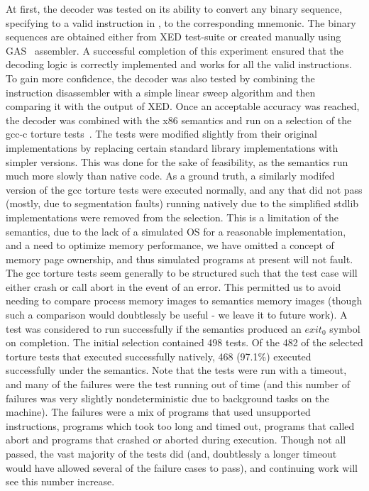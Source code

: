 At first, the decoder was tested on its ability to  convert any binary sequence, specifying to a valid instruction in \ISA, to the corresponding mnemonic. The binary sequences are  obtained either from XED test-suite or created manually using GAS~\cite{gas} assembler. A successful completion of this experiment ensured that the decoding logic is correctly implemented and works for all the valid \ISA instructions. To gain more confidence, the decoder was also tested by combining the instruction disassembler with a simple linear sweep algorithm and then comparing it with the output of XED.  Once an acceptable accuracy was reached, the decoder was combined with the x86 semantics and run on a selection of the gcc-c torture tests~\cite{CTORTURE}.  The tests were modified slightly from their original implementations by replacing certain standard library implementations with simpler versions.  This was done for the sake of feasibility, as the semantics run much more slowly than native code.  As a ground truth, a similarly modifed version of the gcc torture tests were executed normally, and any that did not pass (mostly, due to segmentation faults) running natively due to the simplified stdlib implementations were removed from the selection. This is a limitation of the semantics, due to the lack of a simulated OS for a reasonable implementation, and a need to optimize memory performance, we have omitted a concept of memory page ownership, and thus simulated programs at present will not fault. The gcc torture tests seem generally to be structured such that the test case will either crash or call abort in the event of an error.  This permitted us to avoid needing to compare process memory images to semantics memory images (though such a comparison would doubtlessly be useful - we leave it to future work).  A test was considered to run successfully if the semantics produced an $exit_0$ symbol on completion.  The initial selection contained 498 tests.  Of the 482 of the selected torture tests that executed successfully natively, 468 (97.1\%) executed successfully under the semantics.  Note that the tests were run with a timeout, and many of the failures were the test running out of time (and this number of failures was very slightly nondeterministic due to background tasks on the machine).  The failures were a mix of programs that used unsupported instructions, programs which took too long and timed out, programs that called abort and programs that crashed or aborted during execution.  Though not all passed, the vast majority of the tests did (and, doubtlessly a longer timeout would have allowed several of the failure cases to pass), and continuing work will see this number increase.


